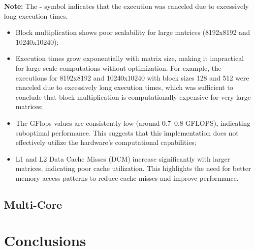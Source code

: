 \documentclass{article}
\begin{document}
\textbf{Note:} The \textbf{-} symbol indicates that the execution was canceled due to excessively long execution times.
\begin{itemize}
    \item Block multiplication shows poor scalability for large matrices (8192x8192 and 10240x10240);
    \item Execution times grow exponentially with matrix size, making it impractical for large-scale computations without optimization. For example, the executions for 8192x8192 and 10240x10240 with block sizes 128 and 512 were canceled due to excessively long execution times, which was sufficient to conclude that block multiplication is computationally expensive for very large matrices;
    \item The GFlops values are consistently low (around 0.7–0.8 GFLOPS), indicating suboptimal performance. This suggests that this implementation does not effectively utilize the hardware's computational capabilities;
    \item L1 and L2 Data Cache Misses (DCM) increase significantly with larger matrices, indicating poor cache utilization. This highlights the need for better memory access patterns to reduce cache misses and improve performance.
\end{itemize}

\subsection{Multi-Core}

\section{Conclusions}
\end{document}

